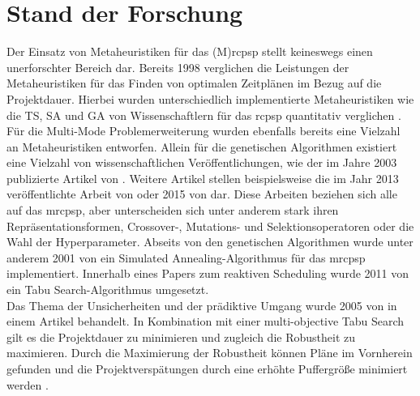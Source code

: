 \section{Stand der Forschung} \label{sec:StandForschung}




Der Einsatz von Metaheuristiken für das (M)\ac{rcpsp} stellt keineswegs einen unerforschter Bereich dar. Bereits 1998 verglichen \cite{kolisch_heuristic_1998} die Leistungen der Metaheuristiken für das Finden von optimalen Zeitplänen im Bezug auf die Projektdauer. Hierbei wurden unterschiedlich implementierte Metaheuristiken wie die \acl{TS}, \acl{SA} und \acl{GA} von Wissenschaftlern für das \ac{rcpsp} quantitativ verglichen \cite[vgl.][S. 17 f.]{kolisch_heuristic_1998}.\\

Für die Multi-Mode Problemerweiterung wurden ebenfalls bereits eine Vielzahl an Metaheuristiken entworfen. Allein für die genetischen Algorithmen existiert eine Vielzahl von wissenschaftlichen Veröffentlichungen, wie der im Jahre 2003 publizierte Artikel von \cite{alcaraz_solving_2003}. Weitere Artikel stellen beispielsweise die im Jahr 2013 veröffentlichte Arbeit von \cite{li_solving_2013} oder 2015 von \cite{sebt_efficient_2015} dar. Diese Arbeiten beziehen sich alle auf das \ac{mrcpsp}, aber unterscheiden sich unter anderem stark ihren Repräsentationsformen, Crossover-, Mutations- und Selektionsoperatoren oder die Wahl der Hyperparameter. Abseits von den genetischen Algorithmen wurde unter anderem 2001 von \cite{jozefowska_simulated_2001} ein Simulated Annealing-Algorithmus für das \ac{mrcpsp} implementiert. Innerhalb eines Papers zum reaktiven Scheduling wurde 2011 von \cite{deblaere_reactive_2011} ein Tabu Search-Algorithmus umgesetzt. \\

Das Thema der Unsicherheiten und der prädiktive Umgang wurde 2005 von \cite{al-fawzan_bi-objective_2005} in einem Artikel behandelt. In Kombination mit einer multi-objective Tabu Search gilt es die Projektdauer zu minimieren und zugleich die Robustheit zu maximieren. Durch die Maximierung der Robustheit können Pläne im Vornherein gefunden und die Projektverspätungen durch eine erhöhte Puffergröße minimiert werden \cite[vgl.][S. 177 f.]{al-fawzan_bi-objective_2005}. \\

